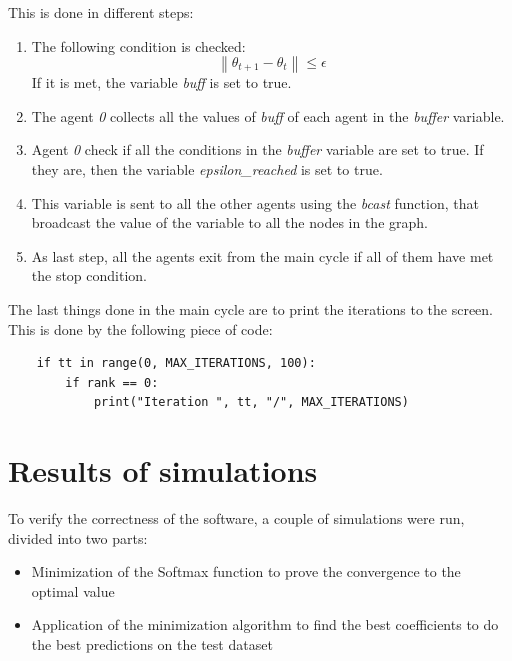 \documentclass[a4paper,11pt,oneside]{book}
\begin{document}
This is done in different steps:
\begin{enumerate}
	\item The following condition is checked:
	\begin{equation}
		\left\lVert \theta_{t+1} - \theta_{t} \right\rVert
		\leq \epsilon
	\end{equation}
	If it is met, the variable \textit{buff} is set to true. 
	\item The agent \textit{0} collects all the values of \textit{buff} of each agent in the \textit{buffer} variable.
	\item Agent \textit{0} check if all the conditions in the \textit{buffer} variable are set to true. If they are, then the variable \textit{epsilon\_reached} is set to true.
	\item This variable is sent to all the other agents using the \textit{bcast} function, that broadcast the value of the variable to all the nodes in the graph.
	\item As last step, all the agents exit from the main cycle if all of them have met the stop condition. 
\end{enumerate}

The last things done in the main cycle are to print the iterations to the screen. This is done by the following piece of code:
\begin{lstlisting}
    if tt in range(0, MAX_ITERATIONS, 100):
        if rank == 0:
            print("Iteration ", tt, "/", MAX_ITERATIONS)
\end{lstlisting}



\chapter{Results of simulations} \label{Cap2}
	To verify the correctness of the software, a couple of simulations were run, divided into two parts:
\begin{itemize}
	\item Minimization of the Softmax function to prove the convergence to the optimal value
		\item Application of the minimization algorithm to find the best coefficients to do the best predictions on the test dataset
\end{itemize}
\end{document}
